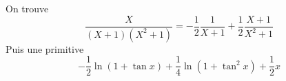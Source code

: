 On trouve
\begin{displaymath}
 \frac{X}{(X+1)(X^2+1)}=-\frac{1}{2}\frac{1}{X+1}+\frac{1}{2}\frac{X+1}{X^2+1}
\end{displaymath}
Puis une primitive
\begin{displaymath}
 -\frac{1}{2}\ln(1+\tan x)+\frac{1}{4}\ln(1+\tan^2 x)+\frac{1}{2}x
\end{displaymath}
